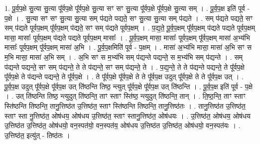 \documentclass[17pt]{extarticle}
\begin{document}
1. पू॒र्व॒प॒क्षे सु॒त्या सु॒त्या पू᳚र्वप॒क्षे पू᳚र्वप॒क्षे सु॒त्या सꣳ सꣳ सु॒त्या पू᳚र्वप॒क्षे पू᳚र्वप॒क्षे सु॒त्या सम् । . पू॒र्व॒प॒क्ष इति॑ पूर्व - प॒क्षे । . सु॒त्या सꣳ सꣳ सु॒त्या सु॒त्या सम् प॑द्यते पद्यते॒ सꣳ सु॒त्या सु॒त्या सम् प॑द्यते । . सम् प॑द्यते पद्यते॒ सꣳ सम् प॑द्यते पूर्वप॒क्षम् पू᳚र्वप॒क्षम् प॑द्यते॒ सꣳ सम् प॑द्यते पूर्वप॒क्षम् । . प॒द्य॒ते॒ पू॒र्व॒प॒क्षम् पू᳚र्वप॒क्षम् प॑द्यते पद्यते पूर्वप॒क्षम् मासा॒ मासाः᳚ पूर्वप॒क्षम् प॑द्यते पद्यते पूर्वप॒क्षम् मासाः᳚ । . पू॒र्व॒प॒क्षम् मासा॒ मासाः᳚ पूर्वप॒क्षम् पू᳚र्वप॒क्षम् मासा॑ अ॒भ्य॑भि मासाः᳚ पूर्वप॒क्षम् पू᳚र्वप॒क्षम् मासा॑ अ॒भि । . पू॒र्व॒प॒क्षमिति॑ पूर्व - प॒क्षम् । . मासा॑ अ॒भ्य॑भि मासा॒ मासा॑ अ॒भि सꣳ स म॒भि मासा॒ मासा॑ अ॒भि सम् । . अ॒भि सꣳ स म॒भ्य॑भि सम् प॑द्यन्ते पद्यन्ते॒ स म॒भ्य॑भि सम् प॑द्यन्ते । . सम् प॑द्यन्ते पद्यन्ते॒ सꣳ सम् प॑द्यन्ते॒ ते ते प॑द्यन्ते॒ सꣳ सम् प॑द्यन्ते॒ ते । . प॒द्य॒न्ते॒ ते ते प॑द्यन्ते पद्यन्ते॒ ते पू᳚र्वप॒क्षे पू᳚र्वप॒क्षे ते प॑द्यन्ते पद्यन्ते॒ ते पू᳚र्वप॒क्षे । . ते पू᳚र्वप॒क्षे पू᳚र्वप॒क्षे ते ते पू᳚र्वप॒क्ष उदुत् पू᳚र्वप॒क्षे ते ते पू᳚र्वप॒क्ष उत् । . पू॒र्व॒प॒क्ष उदुत् पू᳚र्वप॒क्षे पू᳚र्वप॒क्ष उत् ति॑ष्ठन्ति तिष्ठ॒ न्त्युत् पू᳚र्वप॒क्षे पू᳚र्वप॒क्ष उत् ति॑ष्ठन्ति । . पू॒र्व॒प॒क्ष इति॑ पूर्व - प॒क्षे । . उत् ति॑ष्ठन्ति तिष्ठ॒ न्त्युदुत् ति॑ष्ठन्ति॒ ताꣳ स्ताꣳ स्ति॑ष्ठ॒ न्त्युदुत् ति॑ष्ठन्ति॒ तान् । . ति॒ष्ठ॒न्ति॒ ताꣳ स्ताꣳ स्ति॑ष्ठन्ति तिष्ठन्ति॒ तानु॒त्तिष्ठ॑त उ॒त्तिष्ठ॑त॒ स्ताꣳ स्ति॑ष्ठन्ति 
तिष्ठन्ति॒ तानु॒त्तिष्ठ॑तः । . तानु॒त्तिष्ठ॑त उ॒त्तिष्ठ॑त॒ स्ताꣳ स्ता नु॒त्तिष्ठ॑त॒ ओष॑धय॒ ओष॑धय उ॒त्तिष्ठ॑त॒ स्ताꣳ
स्तानु॒त्तिष्ठ॑त॒ ओष॑धयः । . उ॒त्तिष्ठ॑त॒ ओष॑धय॒ ओष॑धय उ॒त्तिष्ठ॑त उ॒त्तिष्ठ॑त॒ ओष॑धयो॒ वन॒स्पत॑यो॒ वन॒स्पत॑य॒ ओष॑धय उ॒त्तिष्ठ॑त उ॒त्तिष्ठ॑त॒ ओष॑धयो॒ वन॒स्पत॑यः । . उ॒त्तिष्ठ॑त॒ इत्यु॑त् - तिष्ठ॑तः । \newline
\end{document}

